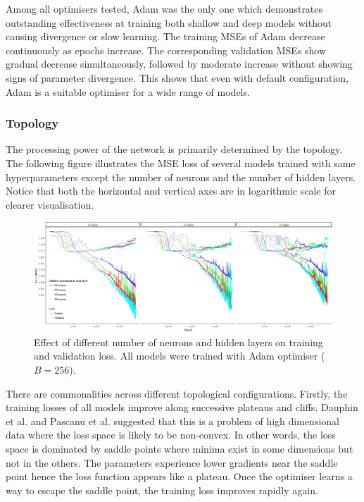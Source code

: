 \documentclass[11pt]{article} %
\theoremstyle{plain}
\theoremstyle{definition}
\begin{document}
Among all optimisers tested, Adam was the only one which demonstrates outstanding effectiveness at training both shallow and deep models without causing divergence or slow learning. The training MSEs of Adam decrease continuously as epochs increase. The corresponding validation MSEs show gradual decrease simultaneously, followed by moderate increase without showing signs of parameter divergence. This shows that even with default configuration, Adam is a suitable optimiser for a wide range of models.

\subsubsection{Topology}

The processing power of the network is primarily determined by the topology. The following figure illustrates the MSE loss of several models trained with same hyperparameters except the number of neurons and the number of hidden layers. Notice that both the horizontal and vertical axes are in logarithmic scale for clearer visualisation.

\begin{figure}[H]
	\centering
	\includegraphics[width=1\textwidth]{loss_neuron_hidden.PNG}
	\caption{Effect of different number of neurons and hidden layers on training and validation loss. All models were trained with Adam optimiser (\(B=256\)).}
	\label{fig:loss_neuron_hidden}
\end{figure}

There are commonalities across different topological configurations. Firstly, the training losses of all models improve along successive plateaus and cliffs. Dauphin et al. \cite{dauphin} and Pascanu et al. \cite{pascanu2014} suggested that this is a problem of high dimensional data where the loss space is likely to be non-convex. In other words, the loss space is dominated by saddle points where minima exist in some dimensions but not in the others. The parameters experience lower gradients near the saddle point hence the loss function appears like a plateau. Once the optimiser learns a way to escape the saddle point, the training loss improves rapidly again.
\end{document}
